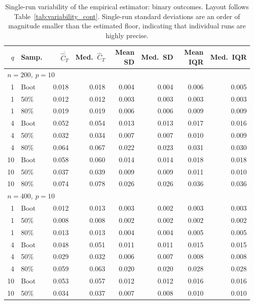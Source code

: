 \documentclass[11pt]{article}
\theoremstyle{plain}
\theoremstyle{definition}
\theoremstyle{remark}
\begin{document}
\newpage

\begin{table}[htbp!]
	\centering
	\footnotesize
	\caption{Single-run variability of the empirical estimator: binary outcomes. Layout follows Table~\ref{tab:variability_cont}. Single-run standard deviations are an order of magnitude smaller than the estimated floor, indicating that individual runs are highly precise.}
	\label{tab:variability_bin}
	\begin{tabular}{rlrrrrrr}
		\hline
		$q$ & Samp.\ & $\overline{\widehat C_T}$ & Med.\ $\widehat C_T$ & Mean SD & Med.\ SD & Mean IQR & Med.\ IQR \\
		\hline
		\multicolumn{8}{l}{\textit{$n = 200$, $p = 10$}} \\[2pt]
		1  & Boot & 0.018 & 0.018 & 0.004 & 0.004 & 0.006 & 0.005 \\
		1  & 50\% & 0.012 & 0.012 & 0.003 & 0.003 & 0.003 & 0.003 \\
		1  & 80\% & 0.019 & 0.019 & 0.006 & 0.006 & 0.009 & 0.009 \\
		4  & Boot & 0.052 & 0.054 & 0.013 & 0.013 & 0.017 & 0.016 \\
		4  & 50\% & 0.032 & 0.034 & 0.007 & 0.007 & 0.010 & 0.009 \\
		4  & 80\% & 0.064 & 0.067 & 0.022 & 0.023 & 0.031 & 0.030 \\
		10 & Boot & 0.058 & 0.060 & 0.014 & 0.014 & 0.018 & 0.018 \\
		10 & 50\% & 0.037 & 0.039 & 0.009 & 0.009 & 0.011 & 0.010 \\
		10 & 80\% & 0.074 & 0.078 & 0.026 & 0.026 & 0.036 & 0.036 \\[4pt]
		\multicolumn{8}{l}{\textit{$n = 400$, $p = 10$}} \\[2pt]
		1  & Boot & 0.012 & 0.013 & 0.003 & 0.002 & 0.003 & 0.003 \\
		1  & 50\% & 0.008 & 0.008 & 0.002 & 0.002 & 0.002 & 0.002 \\
		1  & 80\% & 0.013 & 0.013 & 0.004 & 0.004 & 0.005 & 0.005 \\
		4  & Boot & 0.048 & 0.051 & 0.011 & 0.011 & 0.015 & 0.015 \\
		4  & 50\% & 0.029 & 0.032 & 0.006 & 0.007 & 0.008 & 0.008 \\
		4  & 80\% & 0.059 & 0.063 & 0.020 & 0.020 & 0.028 & 0.028 \\
		10 & Boot & 0.053 & 0.057 & 0.012 & 0.012 & 0.016 & 0.016 \\
		10 & 50\% & 0.034 & 0.037 & 0.007 & 0.008 & 0.010 & 0.010 \\

\end{tabular}
\end{table}
\end{document}
